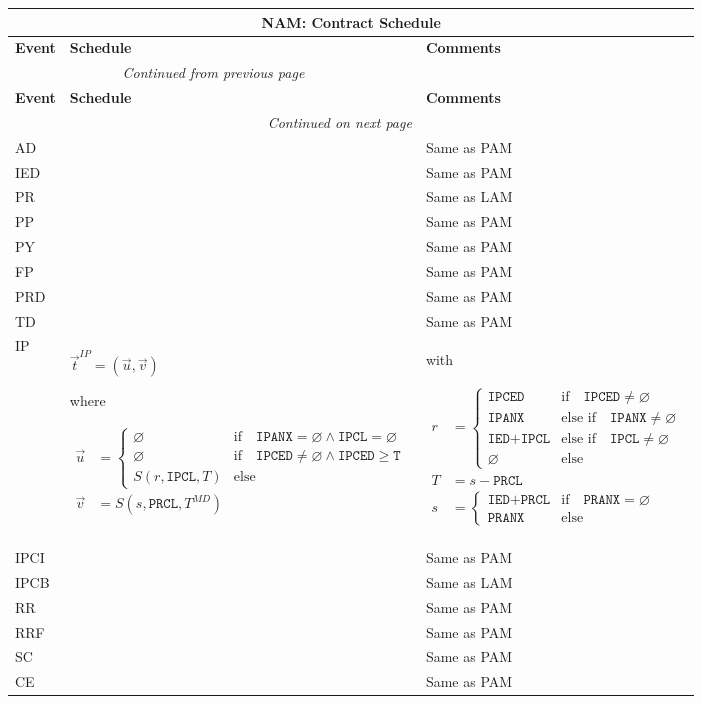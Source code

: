 \documentclass[9pt,oneside]{amsart}
\newenvironment{schedule}[1]{
	\hfill %
	\begin{longtable}{| p{0.05\textwidth} | p{0.5\textwidth} |  p{0.4\textwidth} |}
	\multicolumn{3}{c}{\textbf{#1: Contract Schedule}}\\
	\hline
	\textbf{Event} & \textbf{Schedule} & \textbf{Comments} \\
	\hline
	\endfirsthead
	\multicolumn{2}{c}{\textit{Continued from previous page}} \\
	\hline
	\textbf{Event} & \textbf{Schedule} & \textbf{Comments} \\
	\hline
	\endhead
	\hline \multicolumn{2}{r}{\textit{Continued on next page}} \\
	\endfoot
	\endlastfoot
}{%
	\hline
	\end{longtable}
}
\newcommand{\attr}[1]{\texttt{#1}}
\newcommand{\sdl}[3]{S(#1,#2,#3)}
\newcommand{\undef}{\varnothing}
\begin{document}
\begin{schedule}{NAM}
	AD & & Same as PAM \\
	\hline
	IED & & Same as PAM \\
	\hline
	PR & & Same as LAM \\
	\hline
	PP & & Same as PAM \\
	\hline
	PY & & Same as PAM \\
	\hline
	FP & & Same as PAM \\
	\hline
	PRD & & Same as PAM \\
	\hline
	TD & & Same as PAM \\
	\hline
	IP & $\vec{t}^{IP} = (\vec{u},\vec{v})$ \par
		where \par
		{$\begin{aligned} \vec{u} &= \begin{cases} \undef & \text{if}\quad \attr{IPANX}=\undef\land\attr{IPCL}=\undef \\
							\undef & \text{if}\quad \attr{IPCED}\neq\undef\land\attr{IPCED}\geq\attr{T}\\
							\sdl{r}{\attr{IPCL}}{T} & \text{else} \end{cases} \\
				\vec{v} &= \sdl{s}{\attr{PRCL}}{T^{MD}} \end{aligned}$}
		 & with\par {$\begin{aligned} r &= \begin{cases} \attr{IPCED} & \text{if}\quad \attr{IPCED}\neq\undef \\
								\attr{IPANX} & \text{else if}\quad \attr{IPANX}\neq\undef \\
								\attr{IED}+\attr{IPCL} & \text{else if}\quad \attr{IPCL}\neq\undef \\
								\undef & \text{else} \end{cases} \\
						T &= s-\attr{PRCL} \\
						s &= \begin{cases} \attr{IED}+\attr{PRCL} & \text{if} \quad \attr{PRANX} = \undef \\
					   \attr{PRANX} & \text{else} \end{cases} \end{aligned}$} \\
	\hline
	IPCI & & Same as PAM \\
  	\hline
	IPCB & & Same as LAM \\
	\hline
	RR & & Same as PAM \\
	\hline
	RRF & & Same as PAM \\
  	\hline
	SC & & Same as PAM \\
	\hline
	CE & & Same as PAM \\
\end{schedule}
\end{document}
